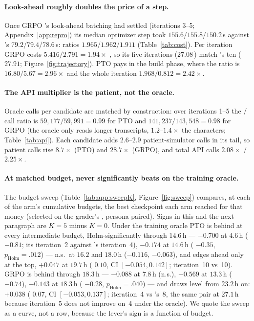 \paragraph{Look-ahead roughly doubles the price of a step.} Once GRPO \Kf{}'s look-ahead
batching had settled (iterations 3--5; Appendix~\ref{app:repro}) its median optimizer step took
$155.6$/$155.8$/$150.2$\,s against \Kz{}'s $79.2$/$79.4$/$78.6$\,s: ratios
$1.965$/$1.962$/$1.911$ (Table~\ref{tab:cost}). Per iteration GRPO \Kf{} costs
$5.416/2.791 = 1.94\times$ \Kz{}, so its five iterations ($27.08$\,\gpuh{}) match \Kz{}'s ten
($27.91$; Figure~\ref{fig:trajectory}). PTO pays in the build phase, where the ratio is
$16.80/5.67 = 2.96\times$ and the whole iteration $1.968/0.812 = 2.42\times$.

\paragraph{The API multiplier is the patient, not the oracle.} Oracle calls per candidate are
matched by construction: over iterations 1--5 the \Kf{}/\Kz{} call ratio is
$59{,}177/59{,}991 = 0.99$ for PTO and $141{,}237/143{,}548 = 0.98$ for GRPO (the oracle only
reads longer transcripts, $1.2$--$1.4\times$ the characters; Table~\ref{tab:api}). Each \Kf{} candidate adds $2.6$--$2.9$
patient-simulator calls in its tail, so patient calls rise $8.7\times$ (PTO) and $28.7\times$
(GRPO), and total API calls $2.08\times$ / $2.25\times$.

\paragraph{At matched budget, \Kf{} never significantly beats \Kz{} on the training oracle.}
The budget sweep (Table~\ref{tab:app:sweepK}, Figure~\ref{fig:sweep}) compares, at each of the
\Kf{} arm's cumulative budgets, the best checkpoint each arm reached for that money (selected on
the grader's \QQ{}, persona-paired). Signs in this and the next paragraph are $K{=}5$
minus $K{=}0$. Under the training oracle PTO \Kf{} is behind at every intermediate budget,
Holm-significantly through $14.6$\,h --- $-0.700$ at $4.6$\,h (\dz{} $-0.81$; its iteration~2
against \Kz{}'s iteration~4), $-0.174$ at $14.6$\,h (\dz{} $-0.35$, $p_{\text{Holm}}{=}.012$)
--- n.s.\ at $16.2$ and $18.0$\,h ($-0.116$, $-0.063$), and edges ahead only at the top,
$+0.047$ at $19.7$\,h (\dz{} $0.10$, CI $[-0.054, 0.142]$; iteration~10 vs~10). GRPO \Kf{} is
behind through $18.3$\,h --- $-0.088$ at $7.8$\,h (n.s.), $-0.569$ at $13.3$\,h (\dz{} $-0.74$),
$-0.143$ at $18.3$\,h (\dz{} $-0.28$, $p_{\text{Holm}}{=}.040$) --- and draws level from
$23.2$\,h on: $+0.038$ (\dz{} $0.07$, CI $[-0.053, 0.137]$; iteration~4 vs \Kz{}'s~8, the same
pair at $27.1$\,h because iteration~5 does not improve on~4 under the oracle). We quote the sweep
as a curve, not a row, because the lever's sign is a function of budget.

